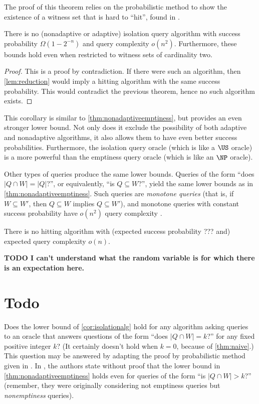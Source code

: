 \documentclass{article}
\newcommand{\todo}[1]{\textbf{TODO #1}}
\begin{document}
The proof of this theorem relies on the probabilistic method to show the existence of a witness set that is hard to ``hit'', found in \autocite{ablp91}.

\begin{corollary}\label{cor:isolationalg}
  There is no (nonadaptive or adaptive) isolation query algorithm with success probability $\Omega(1 - 2^{-n})$ and query complexity $o(n^2)$.
  Furthermore, these bounds hold even when restricted to witness sets of cardinality two.
\end{corollary}
\begin{proof}
  This is a proof by contradiction.
  If there were such an algorithm, then \autoref{lem:reduction} would imply a hitting algorithm with the same success probability.
  This would contradict the previous theorem, hence no such algorithm exists.
\end{proof}

This corollary is similar to \autoref{thm:nonadaptiveemptiness}, but provides an even stronger lower bound.
Not only does it exclude the possibility of both adaptive and nonadaptive algorithms, it also allows them to have even better success probabilities.
Furthermore, the isolation query oracle (which is like a $\US$ oracle) is a more powerful than the emptiness query oracle (which is like an $\NP$ oracle).

Other types of queries produce the same lower bounds.
Queries of the form ``does $|Q \cap W| = |Q|$?'', or equivalently, ``is $Q \subseteq W$?'', yield the same lower bounds as in \autoref{thm:nonadaptiveemptiness}.
Such queries are \emph{monotone queries} (that is, if $W \subseteq W'$, then $Q \subseteq W$ implies $Q \subseteq W'$), and monotone queries with constant success probability have $o(n^2)$ query complexity \autocite[Theorem~1.3]{krw14}.

\begin{theorem}
  There is no hitting algorithm with (expected success probability ??? and) expected query complexity $o(n)$.
\end{theorem}

\todo{I can't understand what the random variable is for which there is an expectation here.}

\section{Todo}

Does the lower bound of \autoref{cor:isolationalg} hold for any algorithm asking queries to an oracle that answers questions of the form ``does $|Q \cap W| = k$?'' for any fixed positive integer $k$?
(It certainly doesn't hold when $k = 0$, because of \autoref{thm:naive}.)
This question may be answered by adapting the proof by probabilistic method given in \autocite{ablp91}.
In \autocite[Remark~2]{krw12}, the authors state without proof that the lower bound in \autoref{thm:nonadaptiveemptiness} holds even for queries of the form ``is $|Q \cap W| > k$?'' (remember, they were originally considering not emptiness queries but \emph{nonemptiness} queries).

\printbibliography{}
\end{document}
